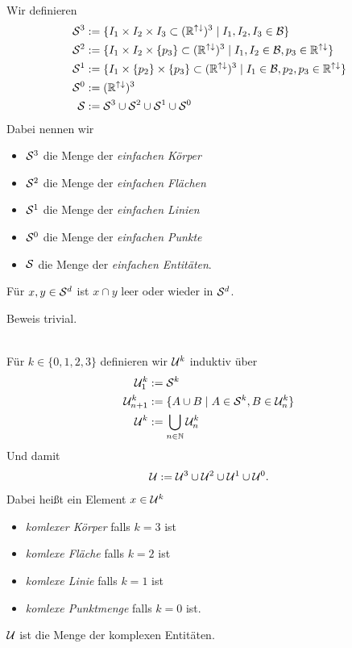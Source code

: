 \begin{dfn}\ \\
    Wir definieren
    \begin{align*}
        \mathcal{S}^3 &:= \{I_1 \times I_2 \times I_3 \subset (\mathbb{R}^{{\uparrow \downarrow}})^3 \mid I_1, I_2, I_3 \in \mathcal{B}\}\\
        \mathcal{S}^2 &:= \{I_1 \times I_2 \times \{p_3\} \subset (\mathbb{R}^{{\uparrow \downarrow}})^3 \mid I_1, I_2 \in \mathcal{B}, p_3 \in \mathbb{R}^{{\uparrow \downarrow}}\}\\
        \mathcal{S}^1 &:= \{I_1 \times \{p_2\} \times \{p_3\} \subset (\mathbb{R}^{{\uparrow \downarrow}})^3 \mid I_1 \in \mathcal{B}, p_2, p_3 \in \mathbb{R}^{{\uparrow \downarrow}}\}\\
        \mathcal{S}^0 &:= (\mathbb{R}^{{\uparrow \downarrow}})^3\\
        \mathcal{S} &:= \mathcal{S}^3 \cup \mathcal{S}^2 \cup \mathcal{S}^1 \cup \mathcal{S}^0
    \end{align*}
    Dabei nennen wir
    \begin{itemize}
        \item $\mathcal{S}^3$ die Menge der \emph{einfachen Körper}
        \item $\mathcal{S}^2$ die Menge der \emph{einfachen Flächen}
        \item $\mathcal{S}^1$ die Menge der \emph{einfachen Linien}
        \item $\mathcal{S}^0$ die Menge der \emph{einfachen Punkte}
        \item $\mathcal{S}$ die Menge der \emph{einfachen Entitäten}.
    \end{itemize}
\end{dfn}

\begin{satz}\label{satz:einf-schnitt}
    Für $x,y \in \mathcal{S}^d$ ist $x \cap y$ leer oder wieder in $\mathcal{S}^d$.
\end{satz}
Beweis trivial.

\begin{dfn}\ \\
    Für $k \in \{0,1,2,3\}$ definieren wir $\mathcal{U}^k$ induktiv über
    \begin{align*}
        \mathcal{U}_1^k &:= \mathcal{S}^k\\
        \mathcal{U}_{n+1}^k &:= \{A \cup B \mid A \in \mathcal{S}^k, B \in \mathcal{U}_n^k\}\\
        \mathcal{U}^k &:= \bigcup_{n \in \mathbb{N}} \mathcal{U}_n^k
    \end{align*}
    Und damit
    \begin{align*}
        \mathcal{U} := \mathcal{U}^3 \cup \mathcal{U}^2 \cup \mathcal{U}^1 \cup \mathcal{U}^0.
    \end{align*}
    Dabei heißt ein Element $x \in \mathcal{U}^k$
    \begin{itemize}
        \item \emph{komlexer Körper} falls $k = 3$ ist
        \item \emph{komlexe Fläche} falls $k = 2$ ist
        \item \emph{komlexe Linie} falls $k = 1$ ist
        \item \emph{komlexe Punktmenge} falls $k = 0$ ist.
    \end{itemize}
    $\mathcal{U}$ ist die Menge der komplexen Entitäten.
\end{dfn}


